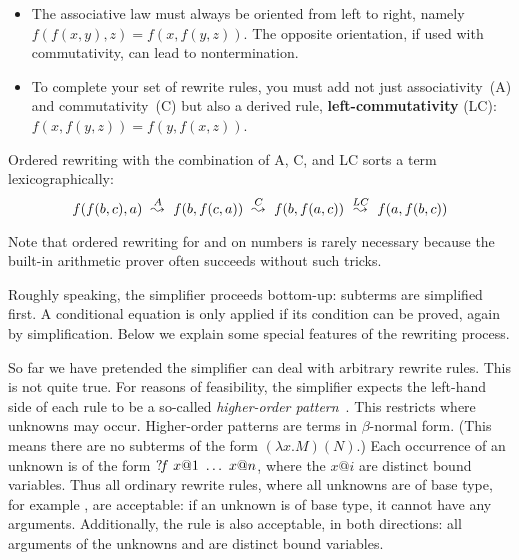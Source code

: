 \begin{isabellebody}
\begin{isamarkuptext}
\begin{itemize}
\item The associative law must always be oriented from left to right,
  namely $f(f(x,y),z) = f(x,f(y,z))$.  The opposite orientation, if
  used with commutativity, can lead to nontermination.

\item To complete your set of rewrite rules, you must add not just
  associativity~(A) and commutativity~(C) but also a derived rule, {\bf
    left-com\-mut\-ativ\-ity} (LC): $f(x,f(y,z)) = f(y,f(x,z))$.
\end{itemize}
Ordered rewriting with the combination of A, C, and LC sorts a term
lexicographically:
\[\def\maps#1{~\stackrel{#1}{\leadsto}~}
 f(f(b,c),a) \maps{A} f(b,f(c,a)) \maps{C} f(b,f(a,c)) \maps{LC} f(a,f(b,c)) \]

Note that ordered rewriting for \isa{{\isacharplus}} and \isa{{\isacharasterisk}} on numbers is rarely
necessary because the built-in arithmetic prover often succeeds without
such tricks.%
\end{isamarkuptext}%
%
%
\begin{isamarkuptext}%
\label{sec:SimpHow}
Roughly speaking, the simplifier proceeds bottom-up: subterms are simplified
first.  A conditional equation is only applied if its condition can be
proved, again by simplification.  Below we explain some special features of
the rewriting process.%
\end{isamarkuptext}%
%
%
\begin{isamarkuptext}%
So far we have pretended the simplifier can deal with arbitrary
rewrite rules. This is not quite true.  For reasons of feasibility,
the simplifier expects the
left-hand side of each rule to be a so-called \emph{higher-order
pattern}~\cite{nipkow-patterns}. 
This restricts where
unknowns may occur.  Higher-order patterns are terms in $\beta$-normal
form.  (This means there are no subterms of the form $(\lambda x. M)(N)$.)  
Each occurrence of an unknown is of the form
${?\!f}~x@1~\dots~x@n$, where the $x@i$ are distinct bound
variables. Thus all ordinary rewrite rules, where all unknowns are
of base type, for example , are acceptable: if an unknown is
of base type, it cannot have any arguments. Additionally, the rule
 is also acceptable, in
both directions: all arguments of the unknowns  and
 are distinct bound variables.


\end{isamarkuptext}
\end{isabellebody}
